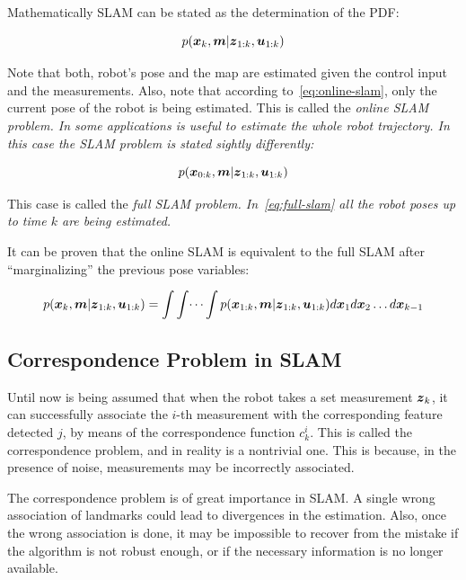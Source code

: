 Mathematically SLAM can be stated as the determination of the PDF:

\begin{equation}
p(\boldsymbol{x}_k,\boldsymbol{m}|\boldsymbol{z}_{1:k},\boldsymbol{u}_{1:k})
\label{eq:online-slam}
\end{equation} 

\noindent
Note that both, robot's pose and the map are estimated given the control input and the measurements. Also, note that according to~\eqref{eq:online-slam}, only the current pose of the robot is being estimated. This is called the \it{online SLAM} problem. In some applications is useful to estimate the whole robot trajectory. In this case the SLAM problem is stated sightly differently:

\begin{equation}
p(\boldsymbol{x}_{0:k},\boldsymbol{m}|\boldsymbol{z}_{1:k},\boldsymbol{u}_{1:k})
\label{eq:full-slam}
\end{equation} 

This case is called the \it{full SLAM} problem. In~\eqref{eq:full-slam} all the robot poses up to time $k$ are being estimated.

It can be proven that the online SLAM is equivalent to the full SLAM after ``marginalizing'' the previous pose variables:

\begin{equation}
p(\boldsymbol{x}_k,\boldsymbol{m}|\boldsymbol{z}_{1:k},\boldsymbol{u}_{1:k}) = \int \int \dots \int 
p(\boldsymbol{x}_{1:k},\boldsymbol{m}|\boldsymbol{z}_{1:k},\boldsymbol{u}_{1:k}) d\boldsymbol{x}_1 d\boldsymbol{x}_2 \dots d\boldsymbol{x}_{k-1}
\end{equation}

\subsection{Correspondence Problem in SLAM}

Until now is being assumed that when the robot takes a set measurement $\boldsymbol{z}_k$, it can successfully associate the $i$-th measurement with the corresponding feature detected $j$, by means of the correspondence function $c_k^i$. This is called the correspondence problem, and in reality is a nontrivial one. This is because, in the presence of noise, measurements may be incorrectly associated. 

The correspondence problem is of great importance in SLAM. A single wrong association of landmarks could lead to divergences in the estimation. Also, once the wrong association is done, it may be impossible to recover from the mistake if the algorithm is not robust enough, or if the necessary information is no longer available.

